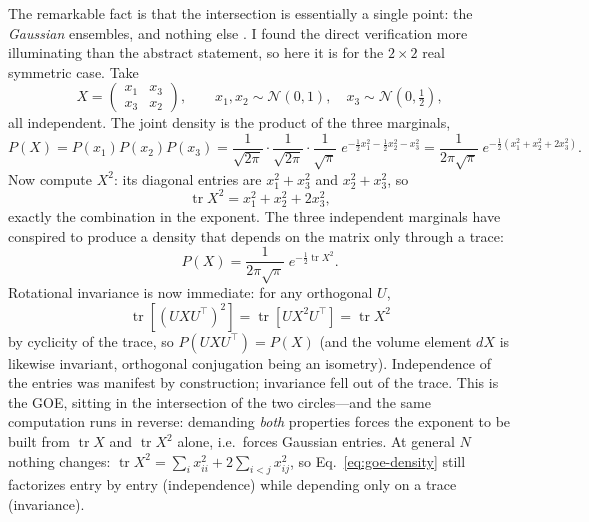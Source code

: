 \documentclass[11pt]{article}
\newcommand{\tr}{\operatorname{tr}}
\begin{document}
The remarkable fact is that the intersection is essentially a single
point: the \emph{Gaussian} ensembles, and nothing else \cite{mehta2004}.
I found the direct verification more illuminating than the abstract
statement, so here it is for the $2\times2$ real symmetric case. Take
\[
X=\begin{pmatrix} x_1 & x_3\\ x_3 & x_2\end{pmatrix},
\qquad
x_1,x_2\sim\mathcal N(0,1),\quad x_3\sim\mathcal N(0,\tfrac12),
\]
all independent. The joint density is the product of the three marginals,
\[
P(X)=P(x_1)P(x_2)P(x_3)
=\frac{1}{\sqrt{2\pi}}\cdot\frac{1}{\sqrt{2\pi}}\cdot\frac{1}{\sqrt{\pi}}
\;e^{-\frac12 x_1^{2}-\frac12 x_2^{2}-x_3^{2}}
=\frac{1}{2\pi\sqrt{\pi}}\;
e^{-\frac12\left(x_1^{2}+x_2^{2}+2x_3^{2}\right)}.
\]
Now compute $X^{2}$: its diagonal entries are $x_1^{2}+x_3^{2}$ and
$x_2^{2}+x_3^{2}$, so
\[
\tr X^{2}=x_1^{2}+x_2^{2}+2x_3^{2},
\]
exactly the combination in the exponent. The three independent marginals
have conspired to produce a density that depends on the matrix only
through a trace:
\begin{equation}
P(X)=\frac{1}{2\pi\sqrt{\pi}}\;e^{-\frac12\tr X^{2}}.
\label{eq:goe-density}
\end{equation}
Rotational invariance is now immediate: for any orthogonal $U$,
\[
\tr\!\left[(UXU^{\top})^{2}\right]
=\tr\!\left[UX^{2}U^{\top}\right]
=\tr X^{2}
\]
by cyclicity of the trace, so $P(UXU^{\top})=P(X)$ (and the volume
element $dX$ is likewise invariant, orthogonal conjugation being an
isometry). Independence of the entries was manifest by construction;
invariance fell out of the trace. This is the GOE, sitting in the
intersection of the two circles---and the same computation runs in
reverse: demanding \emph{both} properties forces the exponent to be built
from $\tr X$ and $\tr X^{2}$ alone, i.e.\ forces Gaussian entries. At
general $N$ nothing changes:
$\tr X^{2}=\sum_i x_{ii}^{2}+2\sum_{i<j}x_{ij}^{2}$, so
Eq.~\eqref{eq:goe-density} still factorizes entry by entry (independence)
while depending only on a trace (invariance).
\end{document}
